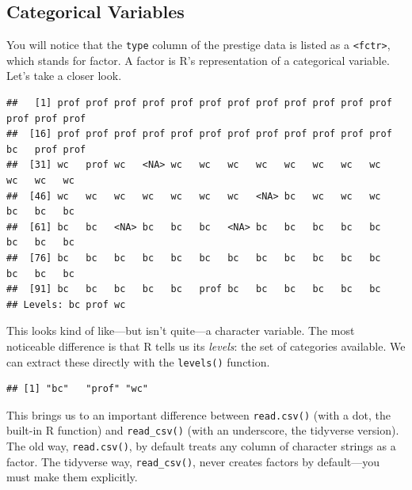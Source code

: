\documentclass[
  12pt,
  oneside,openany]{book}
\newenvironment{Shaded}{\begin{snugshade}}{\end{snugshade}}
\newcommand{\KeywordTok}[1]{\textcolor[rgb]{0.13,0.29,0.53}{\textbf{#1}}}
\newcommand{\NormalTok}[1]{#1}
\newcommand{\OperatorTok}[1]{\textcolor[rgb]{0.81,0.36,0.00}{\textbf{#1}}}
\begin{document}
\hypertarget{categorical-variables-1}{%
\subsection{Categorical Variables}\label{categorical-variables-1}}

You will notice that the \texttt{type} column of the prestige data is listed as a \texttt{\textless{}fctr\textgreater{}}, which stands for factor. A factor is R's representation of a categorical variable. Let's take a closer look.

\begin{Shaded}
\end{Shaded}

\begin{verbatim}
##   [1] prof prof prof prof prof prof prof prof prof prof prof prof prof prof prof
##  [16] prof prof prof prof prof prof prof prof prof prof prof prof bc   prof prof
##  [31] wc   prof wc   <NA> wc   wc   wc   wc   wc   wc   wc   wc   wc   wc   wc  
##  [46] wc   wc   wc   wc   wc   wc   wc   <NA> bc   wc   wc   wc   bc   bc   bc  
##  [61] bc   bc   <NA> bc   bc   bc   <NA> bc   bc   bc   bc   bc   bc   bc   bc  
##  [76] bc   bc   bc   bc   bc   bc   bc   bc   bc   bc   bc   bc   bc   bc   bc  
##  [91] bc   bc   bc   bc   bc   prof bc   bc   bc   bc   bc   bc  
## Levels: bc prof wc
\end{verbatim}

This looks kind of like---but isn't quite---a character variable. The most noticeable difference is that R tells us its \emph{levels}: the set of categories available. We can extract these directly with the \texttt{levels()} function.

\begin{Shaded}
\end{Shaded}

\begin{verbatim}
## [1] "bc"   "prof" "wc"
\end{verbatim}

This brings us to an important difference between \texttt{read.csv()} (with a dot, the built-in R function) and \texttt{read\_csv()} (with an underscore, the tidyverse version). The old way, \texttt{read.csv()}, by default treats any column of character strings as a factor. The tidyverse way, \texttt{read\_csv()}, never creates factors by default---you must make them explicitly.
\end{document}
